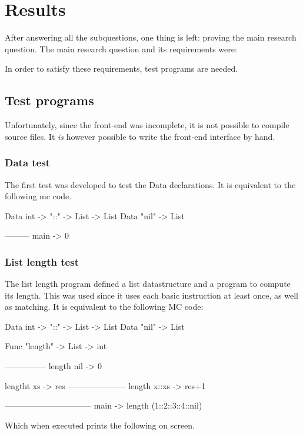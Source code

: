 \section{Results}\label{results}
After answering all the subquestions, one thing is left: proving the main research question.
The main research question and its requirements were:



In order to satisfy these requirements, test programs are needed.

\subsection{Test programs}
Unfortunately, since the front-end was incomplete, it is not possible to compile source files.
It \textit{is} however possible to write the front-end interface by hand.

\subsubsection{Data test}
The first test was developed to test the Data declarations.
It is equivalent to the following mc code.

\begin{MC}
Data int -> "::" -> List -> List
Data "nil" -> List

---------
main -> 0
\end{MC}

\subsubsection{List length test}
The list length program defined a list datastructure and a program to compute its length.
This was used since it uses each basic instruction at least once, as well as matching.
It is equivalent to the following MC code:

\begin{MC}
Data int -> "::" -> List -> List
Data "nil" -> List

Func "length" -> List -> int

---------------
length nil -> 0

lengtht xs -> res
---------------------
length x::xs -> res+1

--------------------------------
main -> length (1::2::3::4::nil)
\end{MC}

Which when executed prints the following on screen.

